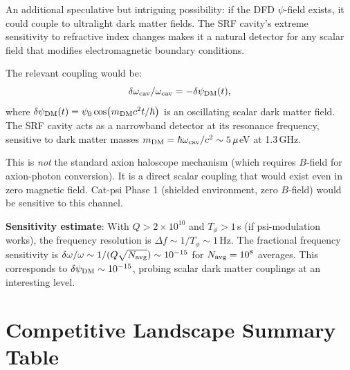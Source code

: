 \documentclass[11pt]{article}
\theoremstyle{definition}
\theoremstyle{remark}
\newcommand{\ee}[1]{\times 10^{#1}}
\begin{document}
An additional speculative but intriguing possibility: if the DFD
$\psi$-field exists, it could couple to ultralight dark matter fields.
The SRF cavity's extreme sensitivity to refractive index changes makes
it a natural detector for any scalar field that modifies electromagnetic
boundary conditions.

The relevant coupling would be:
\begin{equation}
\delta\omega_{\rm cav}/\omega_{\rm cav} = -\delta\psi_{\rm DM}(t),
\end{equation}
where $\delta\psi_{\rm DM}(t) = \psi_0 \cos(m_{\rm DM} c^2 t / \hbar)$
is an oscillating scalar dark matter field. The SRF cavity acts as a
narrowband detector at its resonance frequency, sensitive to dark matter
masses $m_{\rm DM} = \hbar\omega_{\rm cav}/c^2 \sim 5\,\mu$eV at 1.3\,GHz.

This is \emph{not} the standard axion haloscope mechanism (which requires
$B$-field for axion-photon conversion). It is a direct scalar coupling
that would exist even in zero magnetic field. Cat-psi Phase 1 (shielded
environment, zero $B$-field) would be sensitive to this channel.

\textbf{Sensitivity estimate}: With $Q > 2\ee{10}$ and $T_\phi > 1$\,s
(if psi-modulation works), the frequency resolution is
$\Delta f \sim 1/T_\phi \sim 1$\,Hz. The fractional frequency sensitivity
is $\delta\omega/\omega \sim 1/(Q \sqrt{N_{\rm avg}}) \sim 10^{-15}$ for
$N_{\rm avg} = 10^8$ averages. This corresponds to
$\delta\psi_{\rm DM} \sim 10^{-15}$, probing scalar dark matter
couplings at an interesting level.

\section{Competitive Landscape Summary Table}
\label{sec:landscape}
\end{document}
